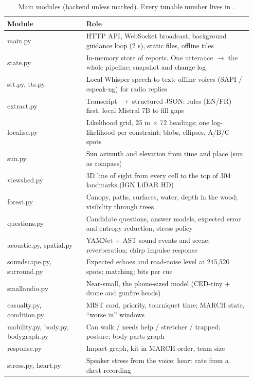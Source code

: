 \begin{table}[htbp]\centering\small
\caption{Main modules (backend unless marked). Every tunable number lives in .}\label{tab:modules}
\begin{tabularx}{\linewidth}{>{\ttfamily\raggedright}p{3.4cm}X}
\toprule
\normalfont Module & Role\\
\midrule
main.py & HTTP API, WebSocket broadcast, background guidance loop (2 s), static files, offline tiles\\
state.py & In-memory store of reports. One utterance $\rightarrow$ the whole pipeline; snapshot and change log\\
stt.py, tts.py & Local Whisper speech-to-text; offline voices (SAPI / espeak-ng) for radio replies\\
extract.py & Transcript $\rightarrow$ structured JSON: rules (EN/FR) first, local Mistral 7B to fill gaps\\
localise.py & Likelihood grid, 25 m $\times$ 72 headings; one log-likelihood per constraint; blobs, ellipses, A/B/C spots\\
sun.py & Sun azimuth and elevation from time and place (sun as compass)\\
viewshed.py & 3D line of sight from every cell to the top of 304 landmarks (IGN LiDAR HD)\\
forest.py & Canopy, paths, surfaces, water, depth in the wood; visibility through trees\\
questions.py & Candidate questions, answer models, expected error and entropy reduction, stress policy\\
acoustic.py, spatial.py & YAMNet + AST sound events and scene; reverberation; chirp impulse response\\
soundscape.py, surround.py & Expected echoes and road-noise level at 245,520 spots; matching; bits per cue\\
smallaudio.py & Near-small, the phone-sized model (CED-tiny + drone and gunfire heads)\\
casualty.py, condition.py & MIST card, priority, tourniquet time; MARCH state, ``worse in'' windows\\
mobility.py, body.py, bodygraph.py & Can walk / needs help / stretcher / trapped; posture; body parts graph\\
response.py & Impact graph, kit in MARCH order, team size\\
stress.py, heart.py & Speaker stress from the voice; heart rate from a chest recording\\

\end{tabularx}
\end{table}

